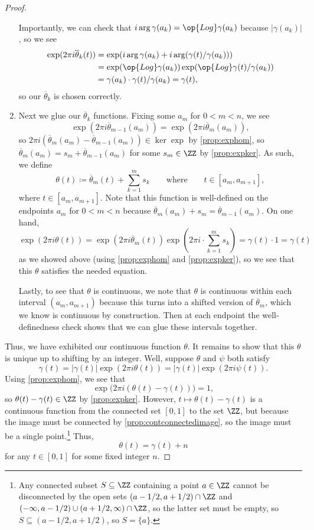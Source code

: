 \documentclass[../notes.tex]{subfiles}
\begin{document}
\begin{proof}
\begin{enumerate}
		Importantly, we can check that $i\arg\gamma(a_k)=\op{Log}\gamma(a_k)$ because $|\gamma(a_k)|$, so we see
		\begin{align*}
			\exp(2\pi i\overline\theta_k(t)) &= \exp(i\arg\gamma(a_k)+i\arg(\gamma(t)/\gamma(a_k))) \\
			&= \exp(\op{Log}\gamma(a_k))\exp(\op{Log}\gamma(t)/\gamma(a_k)) \\
			&= \gamma(a_k)\cdot\gamma(t)/\gamma(a_k)=\gamma(t),
		\end{align*}
		so our $\overline\theta_k$ is chosen correctly.
		\item Next we glue our $\overline\theta_k$ functions. Fixing some $a_m$ for $0<m<n$, we see
		\[\exp(2\pi i\overline\theta_{m-1}(a_m))=\exp(2\pi i\overline\theta_m(a_m)),\]
		so $2\pi i(\overline\theta_m(a_m)-\overline\theta_{m-1}(a_m))\in\ker\exp$ by \autoref{prop:exphom}, so $\overline\theta_m(a_m)=s_m+\overline\theta_{m-1}(a_m)$ for some $s_m\in\ZZ$ by \autoref{prop:expker}. As such, we define
		\[\theta(t)\coloneqq \overline\theta_m(t)+\sum_{k=1}^ms_k\qquad\text{where}\qquad t\in[a_m,a_{m+1}],\]
		where $t\in[a_m,a_{m+1}]$. Note that this function is well-defined on the endpoints $a_m$ for $0<m<n$ because $\overline\theta_m(a_m)+s_m=\overline\theta_{m-1}(a_m)$. On one hand,
		\[\exp(2\pi i\theta(t))=\exp(2\pi i\overline\theta_m(t))\exp\left(2\pi i\cdot\sum_{k=1}^ms_k\right)=\gamma(t)\cdot1=\gamma(t)\]
		as we showed above (using \autoref{prop:exphom} and \autoref{prop:expker}), so we see that this $\theta$ satisfies the needed equation.

		Lastly, to see that $\theta$ is continuous, we note that $\theta$ is continuous within each interval $(a_m,a_{m+1})$ because this turns into a shifted version of $\overline\theta_m$, which we know is continuous by construction. Then at each endpoint the well-definedness check shows that we can glue these intervals together.
	\end{enumerate}
	Thus, we have exhibited our continuous function $\theta$. It remains to show that this $\theta$ is unique up to shifting by an integer. Well, suppose $\theta$ and $\psi$ both satisfy
	\[\gamma(t)=|\gamma(t)|\exp(2\pi i\theta(t))=|\gamma(t)|\exp(2\pi i\psi(t)).\]
	Using \autoref{prop:exphom}, we see that
	\[\exp\big(2\pi i(\theta(t)-\gamma(t))\big)=1,\]
	so $\theta(t)-\gamma(t)\in\ZZ$ by \autoref{prop:expker}. However, $t\mapsto\theta(t)-\gamma(t)$ is a continuous function from the connected set $[0,1]$ to the set $\ZZ$, but because the image must be connected by \autoref{prop:contconnectedimage}, so the image must be a single point.\footnote{Any connected subset $S\subseteq\ZZ$ containing a point $a\in\ZZ$ cannot be disconnected by the open sets $(a-1/2,a+1/2)\cap\ZZ$ and $(-\infty,a-1/2)\cup(a+1/2,\infty)\cap\ZZ$, so the latter set must be empty, so $S\subseteq(a-1/2,a+1/2)$, so $S=\{a\}$.} Thus,
	\[\theta(t)=\gamma(t)+n\]
	for any $t\in[0,1]$ for some fixed integer $n$.
\end{proof}
\end{document}
